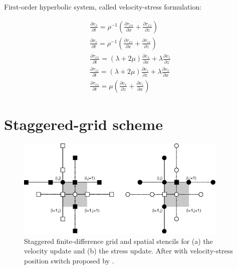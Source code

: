\documentclass{gnulike}
\begin{document}
\noindent First-order hyperbolic system, called velocity-stress formulation:

\begin{eqnarray}
  \label{eq:velocity-stress}
  \frac{\partial v_{x}}{\partial t} = \rho^{{\scriptscriptstyle-1}} \left( \frac{\partial \tau_{xx}}{\partial x} + \frac{\partial \tau_{xz}}{\partial z} \right) \nonumber \\
  \frac{\partial v_{z}}{\partial t} = \rho^{{\scriptscriptstyle -1}} \left( \frac{\partial \tau_{xz}}{\partial x} + \frac{\partial \tau_{zz}}{\partial z} \right) \nonumber \\
  \frac{\partial \tau_{xx}}{\partial t} = (\lambda+2\mu)\frac{\partial v_{x}}{\partial x} + \lambda \frac{\partial v_{z}}{\partial z} \\
  \frac{\partial \tau_{zz}}{\partial t} = (\lambda+2\mu)\frac{\partial v_{z}}{\partial z} + \lambda \frac{\partial v_{x}}{\partial x} \nonumber \\
  \frac{\partial \tau_{xz}}{\partial t} = \mu \left( \frac{\partial v_{x}}{\partial z} + \frac{\partial v_{z}}{\partial x } \right) \nonumber
\end{eqnarray}

\section{Staggered-grid scheme}

\cite{virieux1986psv,levander1988fourth,bohlen2006accuracy}

\begin{figure}[!ht]
  \centering
  \includegraphics[width=0.9\textwidth]{fig/staggered.eps}
  \caption{Staggered finite-difference grid and spatial stencils for (a) the velocity update and (b) the stress update. After \cite{levander1988fourth} with velocity-stress position switch proposed by \cite{bohlen2006accuracy}.}
  \label{fig:staggered-grid}
\end{figure}
\end{document}
